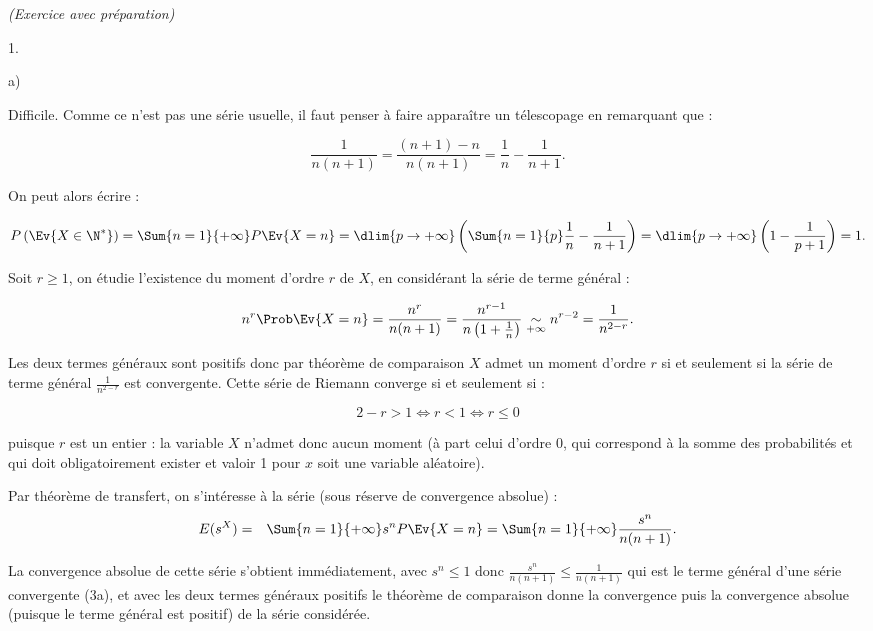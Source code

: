 \documentclass[11pt]{article}%
\begin{document}
\begin{exercice}{\it (Exercice avec préparation)}
\begin{noliste}{1.}
 \begin{noliste}{a)}
 \setlength{\itemsep}{2mm}

 \item Difficile. Comme ce n'est pas une série usuelle, il faut penser
à faire apparaître un télescopage en remarquant que : 
 
\[
 \frac{ 1 }{ n (n + 1) } = \frac{ (n + 1) - n }{ n (n + 1) } = \frac{ 1
}{ n } - \frac{ 1 }{ n + 1 }. 
\]

 On peut alors écrire : 
 
\[
 P \left(\Ev{ X \in \N^* }\right) = \Sum{n = 1}{+ \infty} P \Ev{ X = n
} = \dlim{ p \rightarrow + \infty} \left( \Sum{n = 1}{p} \frac{ 1 }{ n
} - \frac{ 1 }{ n + 1 } \right) = \dlim{ p \rightarrow + \infty} \left(
1 - \frac{ 1 }{ p + 1} \right) = 1. 
\]

 \item Soit $r \geq 1$, on étudie l'existence du moment d'ordre $r$ de
$X$, en considérant la série de terme général : 
 
\[
 n^{r} \Prob\Ev{ X = n } = \frac{ n^{r} }{ n (n + 1) } = \frac{ n^{ r-1
} }{ n \left( 1 + \frac{1}{n} \right) } \underset{ + \infty }{ \sim }
n^{ r- 2 } = \frac{ 1 }{ n^{ 2 - r } }. 
\]

 Les deux termes généraux sont positifs donc par théorème de
comparaison $X$ admet un moment d'ordre $r$ si et seulement si la série
de terme général $\frac{ 1 }{ n^{ 2-r } }$ est convergente. Cette série
de Riemann converge si et seulement si : 
 
\[
 2 - r > 1 \Longleftrightarrow r < 1 \Longleftrightarrow r \leq 0 
\]

 puisque $r$ est un entier : la variable $X$ n'admet donc aucun moment
(à part celui d'ordre 0, qui correspond à la somme des probabilités et
qui doit obligatoirement exister et valoir 1 pour $x$ soit une variable
aléatoire). \\

 \item Par théorème de transfert, on s'intéresse à la série (sous
réserve de convergence absolue) : 
 \begin{eqnarray*}
 E ( s^{X} ) & = & \Sum{n = 1}{+ \infty} s^{n} P \Ev{ X = n } = \Sum{ n
= 1 }{ + \infty } \frac{ s^{n} }{ n (n + 1) }. 
 \end{eqnarray*}

 La convergence absolue de cette série s'obtient immédiatement, avec
$s^{n} \leq 1$ donc $\frac{ s^{n} }{ n (n + 1) } \leq \frac{ 1 }{ n (n
+ 1) }$ qui est le terme général d'une série convergente (3a), et avec
les deux termes généraux positifs le théorème de comparaison donne la
convergence puis la convergence absolue (puisque le terme général est
positif) de la série considérée. \\


\end{noliste}
\end{noliste}
\end{exercice}
\end{document}
